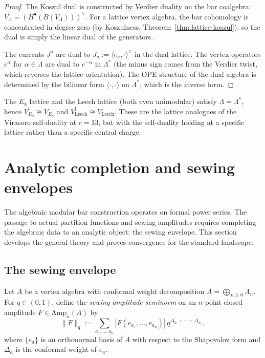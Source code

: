 \begin{proof}
The Koszul dual is constructed by Verdier duality on the bar coalgebra:
$V_\Lambda^! = (H^\bullet(B(V_\Lambda)))^\vee$. For a lattice vertex
algebra, the bar cohomology is concentrated in degree zero (by Koszulness,
Theorem~\ref{thm:lattice-koszul}), so the dual is simply the linear dual
of the generators.

The currents $J^a$ are dual to $J_a := \langle e_a,\cdot\rangle^\vee$
in the dual lattice. The vertex operators $e^\alpha$ for $\alpha\in\Lambda$
are dual to $e^{-\alpha}$ in $\Lambda^*$ (the minus sign comes from the
Verdier twist, which reverses the lattice orientation). The OPE structure
of the dual algebra is determined by the bilinear form
$\langle\cdot,\cdot\rangle$ on $\Lambda^*$, which is the inverse form.
\end{proof}

\begin{remark}
The $E_8$ lattice and the Leech lattice (both even unimodular) satisfy
$\Lambda = \Lambda^*$, hence $V_{E_8}^! \cong V_{E_8}$ and
$V_{\mathrm{Leech}}^! \cong V_{\mathrm{Leech}}$. These are the lattice
analogues of the Virasoro self-duality at $c = 13$, but with the
self-duality holding at a specific lattice rather than a specific
central charge.
\end{remark}


\section{Analytic completion and sewing envelopes}

The algebraic modular bar construction operates on formal power series.
The passage to actual partition functions and sewing amplitudes requires
completing the algebraic data to an analytic object: the sewing envelope.
This section develops the general theory and proves convergence for the
standard landscape.

\subsection{The sewing envelope}

\begin{definition}
Let $A$ be a vertex algebra with conformal weight decomposition
$A = \bigoplus_{n \ge 0} A_n$. For $q \in (0,1)$, define the
\emph{sewing amplitude seminorm} on an $n$-point closed amplitude
$F \in \mathrm{Amp}_n(A)$ by
\begin{equation}%
\|F\|_q
:=
\sum_{a_1,\dots,a_n}
|F(e_{a_1},\dots,e_{a_n})|\,
q^{\Delta_{a_1} + \cdots + \Delta_{a_n}},
\end{equation}
where $\{e_a\}$ is an orthonormal basis of $A$ with respect to the
Shapovalov form and $\Delta_a$ is the conformal weight of $e_a$.
\end{definition}


